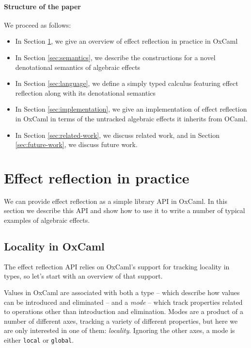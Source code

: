 \documentclass[acmsmall, screen, nonacm]{acmart}
\theoremstyle{definition}
\begin{document}
\paragraph{Structure of the paper} We proceed as follows:
\begin{itemize}
\item In Section \ref{sec:pracice}, we give an overview of effect reflection in
  practice in OxCaml
\item In Section \ref{sec:semantics}, we describe the constructions for a
  novel denotational semantics of algebraic effects
\item In Section \ref{sec:language}, we define a simply typed calculus featuring
  effect reflection along with its denotational semantics
\item In Section \ref{sec:implementation}, we give an implementation of effect
  reflection in OxCaml in terms of the untracked algebraic effects it
  inherits from OCaml.
\item In Section \ref{sec:related-work}, we discuss related work, and in
  Section \ref{sec:future-work}, we discuss future work.
\end{itemize}

\section{Effect reflection in practice}
\label{sec:pracice}

We can provide effect reflection as a simple library API in OxCaml. In
this section we describe this API and show how to use it to write a
number of typical examples of algebraic effects.

\subsection{Locality in OxCaml}

The effect reflection API relies on OxCaml's support for tracking
locality in types, so let's start with an overview of that support.

Values in OxCaml are associated with both a type -- which describe how
values can be introduced and eliminated -- and a \emph{mode} -- which
track properties related to operations other than introduction and
elimination. Modes are a product of a number of different axes, tracking
a variety of different properties, but here we are only interested in
one of them: \emph{locality}. Ignoring the other axes, a mode is either
\lstinline[style=oxcaml]{local} or \lstinline[style=oxcaml]{global}.
\end{document}
